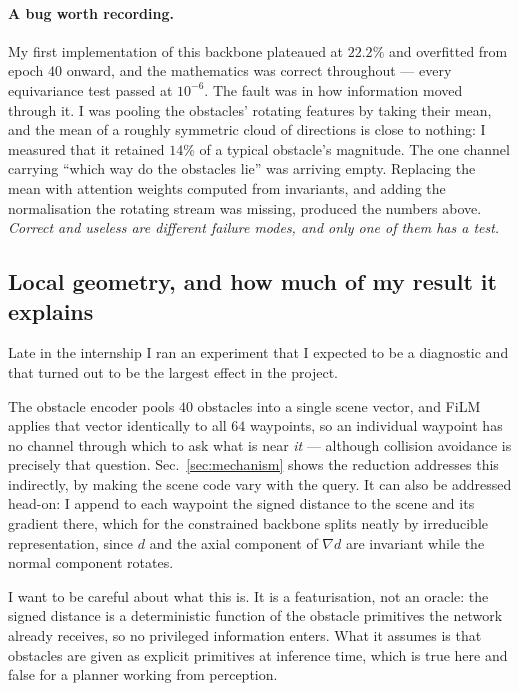 \documentclass[11pt,a4paper]{article}
\begin{document}
\paragraph{A bug worth recording.} My first implementation of this backbone
plateaued at $22.2\%$ and overfitted from epoch $40$ onward, and the mathematics
was correct throughout --- every equivariance test passed at
$10^{-6}$. The fault was in how information moved through it. I was pooling the
obstacles' rotating features by taking their mean, and the mean of a roughly
symmetric cloud of directions is close to nothing: I measured that it retained
$14\%$ of a typical obstacle's magnitude. The one channel carrying ``which way do
the obstacles lie'' was arriving empty. Replacing the mean with attention
weights computed from invariants, and adding the normalisation the rotating
stream was missing, produced the numbers above. \emph{Correct and useless are
different failure modes, and only one of them has a test.}

\subsection{Local geometry, and how much of my result it explains}
\label{sec:localgeom}

Late in the internship I ran an experiment that I expected to be a diagnostic
and that turned out to be the largest effect in the project.

The obstacle encoder pools $40$ obstacles into a single scene vector, and FiLM
applies that vector identically to all $64$ waypoints, so an individual waypoint
has no channel through which to ask what is near \emph{it} --- although
collision avoidance is precisely that question. Sec.~\ref{sec:mechanism} shows
the reduction addresses this indirectly, by making the scene code vary with the
query. It can also be addressed head-on: I append to each waypoint the signed
distance to the scene and its gradient there, which for the constrained backbone
splits neatly by irreducible representation, since $d$ and the axial component of
$\nabla d$ are invariant while the normal component rotates.

I want to be careful about what this is. It is a featurisation, not an oracle:
the signed distance is a deterministic function of the obstacle primitives the
network already receives, so no privileged information enters. What it assumes
is that obstacles are given as explicit primitives at inference time, which is
true here and false for a planner working from perception.
\end{document}
